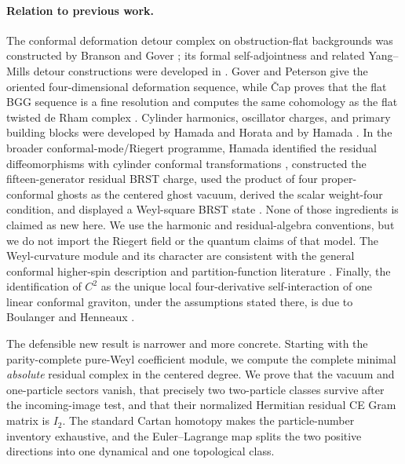 \documentclass[11pt]{article}
\theoremstyle{definition}
\theoremstyle{remark}
\begin{document}
\paragraph{Relation to previous work.}
The conformal deformation detour complex on obstruction-flat backgrounds
was constructed by Branson and Gover \cite{BransonGover}; its formal
self-adjointness and related Yang--Mills detour constructions were developed
in \cite{GoverSombergSoucek}.  Gover and Peterson give the oriented
four-dimensional deformation sequence, while \v{C}ap proves that the flat
BGG sequence is a fine resolution and computes the same cohomology as the
flat twisted de Rham complex \cite{GoverPeterson,CapBGG}.  Cylinder
harmonics, oscillator charges, and
primary building blocks were developed by Hamada and Horata and by Hamada
\cite{HamadaHorata,HamadaBuildingBlocks}.  In the broader
conformal-mode/Riegert programme, Hamada identified the residual
diffeomorphisms with cylinder conformal transformations
\cite{HamadaCFT}, constructed the fifteen-generator residual BRST charge,
used the product of four proper-conformal ghosts as the centered ghost
vacuum, derived the scalar weight-four condition, and displayed a
Weyl-square BRST state \cite{HamadaBRST}.  None of those ingredients is
claimed as new here.  We use the harmonic and residual-algebra conventions,
but we do not import the Riegert field or the quantum claims of that model.
The Weyl-curvature module and its character are consistent with the general
conformal higher-spin description and partition-function literature
\cite{KuzenkoPonds,BeccariaBekaertTseytlin}.  Finally, the identification of
$C^2$ as the unique local four-derivative self-interaction of one linear
conformal graviton, under the assumptions stated there, is due to Boulanger
and Henneaux \cite{BoulangerHenneaux}.

The defensible new result is narrower and more concrete.  Starting with the
parity-complete pure-Weyl coefficient module, we compute the complete
minimal \emph{absolute} residual complex in the centered degree.  We prove
that the vacuum and one-particle sectors vanish, that precisely two
two-particle classes survive after the incoming-image test, and that their
normalized Hermitian residual CE Gram matrix is $I_2$.  The standard
Cartan homotopy makes the particle-number inventory exhaustive, and the
Euler--Lagrange map splits the two positive directions into one dynamical
and one topological class.
\end{document}
